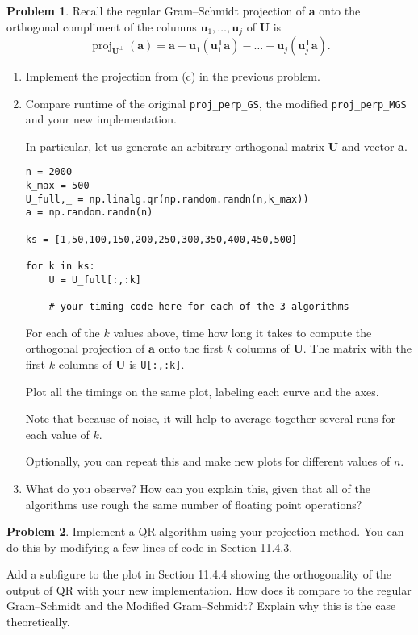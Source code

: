 \documentclass[12pt]{article}
\theoremstyle{definition}
\newtheorem{problem}{Problem}
\renewcommand{\vec}{\mathbf}
\newcommand{\T}{\mathsf{T}}
\begin{document}
\begin{problem}
    Recall the regular Gram--Schmidt projection of $\vec{a}$ onto the orthogonal compliment of the columns $\vec{u}_1, \ldots, \vec{u}_j$ of $\vec{U}$ is
    \[
        \operatorname{proj}_{\vec{U}^\perp}(\vec{a}) = \vec{a} - \vec{u}_1 (\vec{u}_1^\T \vec{a}) - \ldots - \vec{u}_j (\vec{u}_j^\T \vec{a}).
    \]
    \begin{enumerate}
        \item Implement the projection from (c) in the previous problem.

        \item Compare runtime of the original \lstinline{proj_perp_GS}, the modified \lstinline{proj_perp_MGS} and your new implementation.

            In particular, let us generate an arbitrary orthogonal matrix $\vec{U}$ and vector $\vec{a}$.
\begin{lstlisting}
n = 2000
k_max = 500
U_full,_ = np.linalg.qr(np.random.randn(n,k_max))
a = np.random.randn(n)

ks = [1,50,100,150,200,250,300,350,400,450,500]

for k in ks:
    U = U_full[:,:k]

    # your timing code here for each of the 3 algorithms
\end{lstlisting}

            For each of the $k$ values above, time how long it takes to compute the orthogonal projection of $\vec{a}$ onto the first $k$ columns of $\vec{U}$.
            The matrix with the first $k$ columns of $\vec{U}$ is \lstinline{U[:,:k]}.

            Plot all the timings on the same plot, labeling each curve and the axes.

            Note that because of noise, it will help to average together several runs for each value of $k$. 

            Optionally, you can repeat this and make new plots for different values of $n$.

        \item What do you observe? How can you explain this, given that all of the algorithms use rough the same number of floating point operations?
    \end{enumerate}
\end{problem}

\begin{problem}

    Implement a QR algorithm using your projection method. You can do this by modifying a few lines of code in Section 11.4.3.
    
    Add a subfigure to the plot in Section 11.4.4 showing the orthogonality of the output of QR with your new implementation. 
    How does it compare to the regular Gram--Schmidt and the Modified Gram--Schmidt?
    Explain why this is the case theoretically.

\end{problem}
\end{document}
